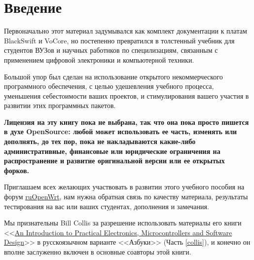\section*{Введение}

Первоначально этот материал задумывался как комплект документации к платам
BlackSwift и VoCore, но постепенно превратился в толстенный учебник для
студентов ВУЗов и научных работнков по специлизациям, связанным с применением
цифровой электроники и компьютерной техники.

Большой упор был сделан на использование открытого некоммерческого программного
обеспечения, с целью удешевления учебного процесса, уменьшения себестоимости
ваших проектов, и стимулирования вашего участия в развитии этих программных пакетов.

\bigskip
\textbf{Лицензия на эту книгу пока не выбрана, так что она пока просто пишется в
духе OpenSource: любой может использовать ее часть, изменять или дополнять, до
тех пор, пока не накладываются какие-либо административные, финансовые или
юридические ограничения на распространение и развитие оригинальной версии или ее
открытых форков.}
\bigskip

Приглашаем всех желающих участвовать в развитии этого учебного пособия на форум
\href{https://groups.google.com/forum/\#!forum/openwrt2ru}{ruOpenWrt}, нам нужна
обратная связь по качеству материала, результаты тестирования на вас или ваших
студентах, дополнения и замечания.
\bigskip

Мы признательны Bill Collis за разрешение использовать материалы его книги
<<\href{www.techideas.co.nz}{An Introduction to 
Practical Electronics, 
Microcontrollers and
Software Design}>>\cite{bcollis} в
русскоязычном варианте <<Азбуки>> (Часть \ref{collis}), и конечно он вполне
заслуженно включен в основные соавторы этой книги.
